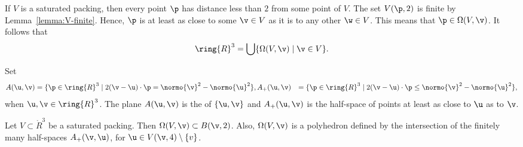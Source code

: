 \begin{remark}
  If $V$ is a saturated packing, then every point $\p$ has distance
  less than $2$ from some point of $V$.  The set $V(\p,2)$ is finite
  by Lemma~\ref{lemma:V-finite}.  Hence, $\p$ is at least as close to
  some $\v\in V$ as it is to any other $\w\in V$.  This means that
  $\p\in\Omega(V,\v)$.  It follows that
\begin{equation}\label{eqn:vor-rn} 
\ring{R}^3 = \bigcup \{\Omega(V,\v)\mid \v \in V\}.
\end{equation}
\end{remark}

\begin{definition}[bisector]
Set
\begin{eqnarray*} 
A(\u,\v) &= \{\p\in\ring{R}^3
\mid 2(\v-\u)\cdot \p = \normo{\v}^2 - \normo{\u}^2 \},
A_+(\u,\v) &= \{\p\in\ring{R}^3
\mid 2(\v-\u)\cdot \p \le \normo{\v}^2 - \normo{\u}^2 \},\\
\end{eqnarray*}
when $\u,\v\in\ring{R}^3$.  The plane $A(\u,\v)$ is the  of
$\{\u,\v\}$ and $A_+(\u,\v)$ is the half-space of points at least as
close to $\u$ as to $\v$.  
\end{definition}

\begin{lemma}[]\label{lemma:V4} 
  Let $V\subset\ring{R}^3$ be a saturated packing.  Then
  $\Omega(V,\v)\subset B(\v,2)$.  Also, $\Omega(V,\v)$ is a polyhedron
  defined by the intersection of the finitely many half-spaces
  $A_+(\v,\u)$, for $\u\in V(\v,4)\setminus\{v\}$.
\end{lemma}

